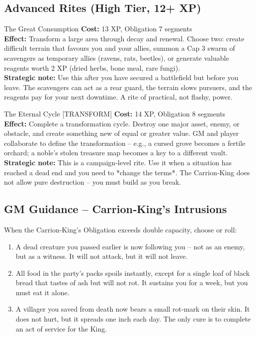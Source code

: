 \documentclass[10pt,a5paper]{book}
\begin{document}
\subsection*{Advanced Rites (High Tier, 12+ XP)}

\begin{patronbox}{The Great Consumption}
\textbf{Cost:} 13 XP, Obligation 7 segments \\
\textbf{Effect:} Transform a large area through decay and renewal. Choose two: create difficult terrain that favours you and your allies, summon a Cap 3 swarm of scavengers as temporary allies (ravens, rats, beetles), or generate valuable reagents worth 2 XP (dried herbs, bone meal, rare fungi). \\
\textbf{Strategic note:} Use this after you have secured a battlefield but before you leave. The scavengers can act as a rear guard, the terrain slows pursuers, and the reagents pay for your next downtime. A rite of practical, not flashy, power.
\end{patronbox}

\begin{patronbox}{The Eternal Cycle [TRANSFORM]}
\textbf{Cost:} 14 XP, Obligation 8 segments \\
\textbf{Effect:} Complete a transformation cycle. Destroy one major asset, enemy, or obstacle, and create something new of equal or greater value. GM and player collaborate to define the transformation – e.g., a cursed grove becomes a fertile orchard; a noble’s stolen treasure map becomes a key to a different vault. \\
\textbf{Strategic note:} This is a campaign‑level rite. Use it when a situation has reached a dead end and you need to *change the terms*. The Carrion‑King does not allow pure destruction – you must build as you break.
\end{patronbox}

\subsection*{GM Guidance – Carrion‑King’s Intrusions}

When the Carrion‑King’s Obligation exceeds double capacity, choose or roll:
\begin{enumerate}
    \item A dead creature you passed earlier is now following you – not as an enemy, but as a witness. It will not attack, but it will not leave.
    \item All food in the party’s packs spoils instantly, except for a single loaf of black bread that tastes of ash but will not rot. It sustains you for a week, but you must eat it alone.
    \item A villager you saved from death now bears a small rot‑mark on their skin. It does not hurt, but it spreads one inch each day. The only cure is to complete an act of service for the King.
\end{enumerate}
\end{document}
